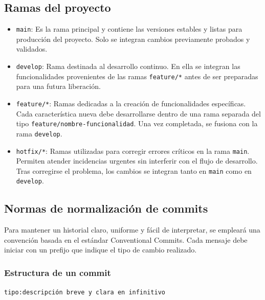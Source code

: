 \documentclass[12pt, a4paper]{article}
\begin{document}
\subsection{Ramas del proyecto}
\begin{itemize}
  \item \texttt{main}: Es la rama principal y contiene las versiones estables y listas para producción del proyecto. Solo se integran cambios previamente probados y validados.
  \item \texttt{develop}: Rama destinada al desarrollo continuo. En ella se integran las funcionalidades provenientes de las ramas \texttt{feature/*} antes de ser preparadas para una futura liberación.
  \item \texttt{feature/*}: Ramas dedicadas a la creación de funcionalidades específicas. Cada característica nueva debe desarrollarse dentro de una rama separada del tipo \texttt{feature/\allowbreak nombre-funcionalidad}. Una vez completada, se fusiona con la rama \texttt{develop}.
  \item \texttt{hotfix/*}: Ramas utilizadas para corregir errores críticos en la rama \texttt{main}. Permiten atender incidencias urgentes sin interferir con el flujo de desarrollo. Tras corregirse el problema, los cambios se integran tanto en \texttt{main} como en \texttt{develop}.
\end{itemize}

\subsection{Normas de normalización de commits}
Para mantener un historial claro, uniforme y fácil de interpretar, se empleará una convención basada en el estándar Conventional Commits. Cada mensaje debe iniciar con un prefijo que indique el tipo de cambio realizado.

\subsubsection{Estructura de un commit}
\texttt{tipo:\allowbreak descripci\'on breve y clara en infinitivo}
\end{document}
